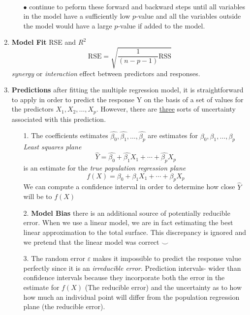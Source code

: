 \documentclass{article}
\begin{document}
\begin{enumerate}
\begin{enumerate}
        \\ $\bullet$ continue to peform these forward and backward steps until all variables in the model have a sufficiently low $p$-value and all the variables outside the model would have a large $p$-value if added to the model.
    \\
    \end{enumerate}
    \item \textbf{Model Fit } RSE and $R^2$  
    \begin{equation*} \text{RSE} = \sqrt{\frac{1}{(n-p-1)}\text{RSS}} \end{equation*}
    \textit{synergy} or \textit{interaction} effect between predictors and responses. \\
    \item \textbf{Predictions } after fitting the multiple regression model, it is straightforward to apply in order to predict the response Y on the basis of a set of values for the predictors $X_1, X_2, \dots, X_p$. However, there are \underline{three} sorts of uncertainty associated with this prediction.
    \begin{enumerate}
        \item[1.] The coefficients estimates $\hat{\beta_0}, \hat{\beta_1}, \dots, \hat{\beta_p}$ are estimates for $\beta_0, \beta_1, \dots, \beta_p$ \textit{Least squares plane} 
        \begin{equation*} \hat{Y} = \hat{\beta_0} + \hat{\beta_1} X_1 + \cdots + \hat{\beta_p} X_p \end{equation*}
        is an estimate for the \textit{true population regression plane}
        \begin{equation*} f(X) = \beta_0 + \beta_1 X_1 + \cdots + \beta_p X_p \end{equation*} 
        We can compute a confidence interval in order to determine how close $\hat{Y}$ will be to $f(X)$ \\
        \item[2.] \textbf{Model Bias } there is an additional source of potentially reducible error. When we use a linear model, we are in fact estimating the best linear approximation to the total surface. This discrepancy is ignored and we pretend that the linear model was correct
        $\smile$\\
        \item[3.] The random error $\varepsilon$ makes it impossible to predict the response value perfectly since it is an \textit{irreducible error}. Prediction intervals- wider than confidence intervals because they incorporate both the error in the estimate for $f(X)$ (The reducible error) and the uncertainty as to how how much an individual point will differ from the population regression plane (the reducible error).
    \end{enumerate}
\end{enumerate}
\end{document}
